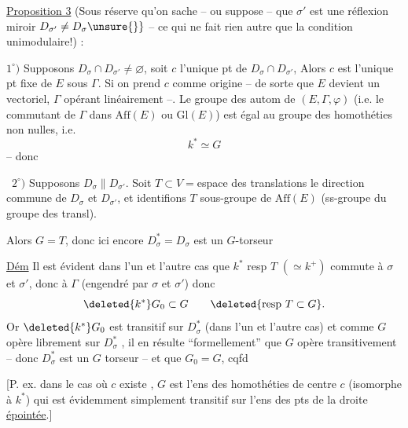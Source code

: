 \uline{Proposition 3} (Sous réserve qu'on sache -- ou suppose -- que $\sigma'$ est une réflexion  miroir $D_{\sigma'}\ne D_\sigma\unsure{\}}$ -- ce qui ne fait rien autre que la condition unimodulaire!) :

$1^\circ)$ Supposons $D_\sigma\cap D_{\sigma'}\ne\varnothing$, soit $c$ l'unique pt de $D_\sigma\cap D_{\sigma'}$,  Alors  $c$ est l'unique pt fixe de $E$ sous $\Gamma$. Si on prend $c$ comme origine -- de sorte que $E$ devient un vectoriel, $\Gamma$ opérant linéairement --. Le groupe  des autom de $(E,\Gamma,\varphi)$ (i.e. le commutant de $\Gamma$ dans $\mathrm{Aff}(E)$ ou $\mathrm{Gl}(E)$) est égal au groupe des  homothéties non nulles, i.e.
\[
k^*\simeq G
\]
-- donc  

\ $2^\circ)$ Supposons $D_\sigma\parallel D_{\sigma'}$. Soit $T\subset V={}$espace des translations le   direction commune de $D_\sigma$ et $D_{\sigma'}$, et identifions $T$    sous-groupe de $\mathrm{Aff}(E)$ (ss-groupe du groupe des transl).

Alors $G=T$, donc ici encore  $D_\sigma^*=D_\sigma$ est un $G$-torseur

\uline{Dém} Il est évident dans l'un et l'autre cas que  $k^*$ resp $T$ $(\simeq k^{+})$ commute à $\sigma$ et $\sigma'$, donc à $\Gamma$ (engendré par $\sigma$ et $\sigma'$) donc
\[
\deleted{k^*}G_0\subset G\qquad\deleted{\text{resp } T\subset G}.
\]
Or $\deleted{k^*}G_0$ est transitif sur $D_\sigma^*$  (dans l'un et l'autre cas) et comme $G$  opère librement sur $D_\sigma^*$ , il en résulte ``formellement'' que $G$ opère transitivement -- donc $D_\sigma^*$ est un $G$ torseur -- et que $G_0=G$, cqfd

[P. ex. dans le cas où $c$ existe , $G$ est l'ens des homothéties de centre $c$ (isomorphe à $k^*$) qui est évidemment simplement transitif sur l'ens des pts de la droite  \uline{épointée}.]

